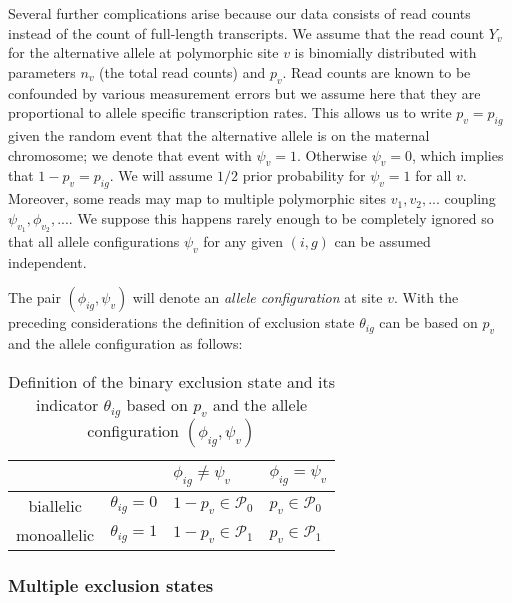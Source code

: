 \documentclass[letterpaper]{article}
\begin{document}
Several further complications arise because our data consists of read counts
instead of the count of full-length transcripts.  We assume that the read
count \(Y_v\) for the alternative allele at polymorphic site \(v\) is
binomially distributed with parameters \(n_v\) (the total read counts) and
\(p_{v}\).   Read counts are known to be confounded by various measurement
errors but we assume here that they are proportional to allele specific
transcription rates.  This allows us to write \(p_v = p_{ig}\) given the
random event that the alternative allele is on the maternal chromosome; we
denote that event with \(\psi_v=1\).  Otherwise \(\psi_v=0\), which implies
that \(1-p_v=p_{ig}\).  We will assume \(1/2\) prior probability for
\(\psi_v=1\) for all \(v\).  Moreover, some reads may map to multiple
polymorphic sites \(v_1,v_2,...\) coupling \(\psi_{v_1},\phi_{v_2},...\).  We
suppose this happens rarely enough to be completely ignored so that all allele
configurations \(\psi_v\) for any given \((i,g)\) can be assumed independent.

The pair \((\phi_{ig},\psi_v)\) will denote an \emph{allele configuration} at
site \(v\).  With the preceding considerations the definition of exclusion
state \(\theta_{ig}\) can be based on \(p_v\) and the allele configuration as
follows:
\begin{table}[h]
\begin{center}
\begin{tabular}{cl|ll|}
& & \(\phi_{ig}\neq\psi_v\) & \(\phi_{ig}=\psi_v\) \\
\hline
biallelic & \(\theta_{ig}=0\) & \(1-p_v \in \mathcal{P}_0\) & \(p_v \in \mathcal{P}_0\) \\
monoallelic & \(\theta_{ig}=1\) & \(1-p_v \in \mathcal{P}_1\) & \(p_v \in \mathcal{P}_1\) \\
\hline
\end{tabular}
\caption{
Definition of the binary exclusion state and its indicator \(\theta_{ig}\) based on
\(p_v\) and the allele configuration \((\phi_{ig},\psi_v)\)
}
\label{tab:def-exclusion-state}
\end{center}
\end{table}

\subsubsection{Multiple exclusion states}
\label{sec:local-multinomial}
\end{document}
